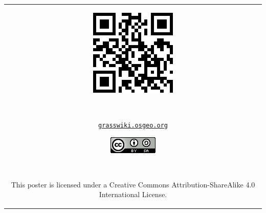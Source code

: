 \documentclass[25pt, margin=0mm, innermargin=15mm, blockverticalspace=15mm, colspace=15mm, subcolspace=8mm]{tikzposter}
\begin{document}
\begin{columns}
{\begin{center}
\begin{tabular}{c}
\begin{minipage}{\qrcodesize}
\includegraphics[width=\textwidth]{./images/qr_grasswiki.pdf}
\end{minipage}
~
\begin{minipage}{0.2\linewidth}
\small {\href{http://grasswiki.osgeo.org}{\nolinkurl{grasswiki.osgeo.org}}}
\end{minipage}

\begin{minipage}{0.1\linewidth}
\href{http://creativecommons.org/licenses/by-sa/4.0/}{\includegraphics[width=\textwidth]{ccbysa}}
\end{minipage}
~
\begin{minipage}{0.35\linewidth}
\small This poster is licensed under a Creative Commons Attribution-ShareAlike 4.0 International License.
\end{minipage}

\end{tabular}
\end{center}

\vspace{0.4cm}
}

\end{columns}
\end{document}
